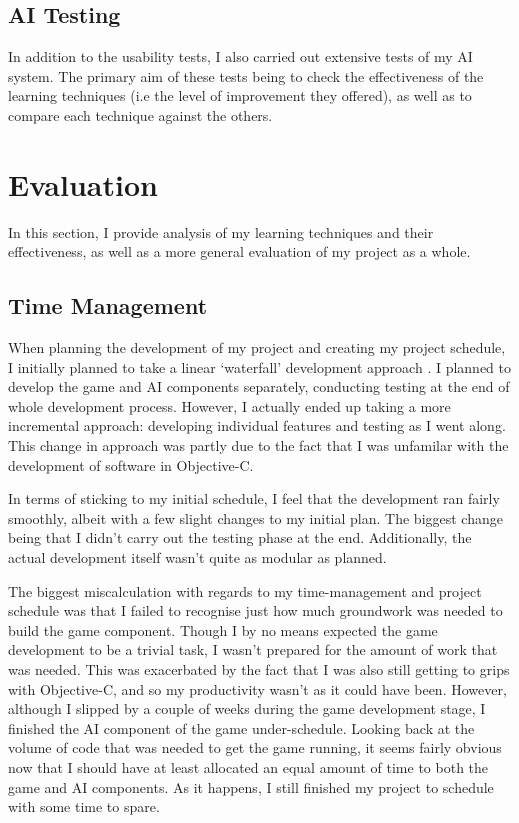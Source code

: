 \documentclass[a4paper,oneside]{report}
\begin{document}
\section{AI Testing}

In addition to the usability tests, I also carried out extensive tests of my AI system. The primary aim of these tests being to check the effectiveness of the learning techniques (i.e the level of improvement they offered), as well as to compare each technique against the others.



%
%

\chapter{Evaluation}

In this section, I provide analysis of my learning techniques and their effectiveness, as well as a more general evaluation of my project as a whole.

\section{Time Management}

When planning the development of my project and creating my project schedule, I initially planned to take a linear `waterfall' development approach \cite{Rerych:gb}. I planned to develop the game and AI components separately, conducting testing at the end of whole development process. However, I actually ended up taking a more incremental approach: developing individual features and testing as I went along. This change in approach was partly due to the fact that I was unfamilar with the development of software in Objective-C.

In terms of sticking to my initial schedule, I feel that the development ran fairly smoothly, albeit with a few slight changes to my initial plan. The biggest change being that I didn't carry out the testing phase at the end. Additionally, the actual development itself wasn't quite as modular as planned.

The biggest miscalculation with regards to my time-management and project schedule was that I failed to recognise just how much groundwork was needed to build the game component. Though I by no means expected the game development to be a trivial task, I wasn't prepared for the amount of work that was needed. This was exacerbated by the fact that I was also still getting to grips with Objective-C, and so my productivity wasn't as it could have been. However, although I slipped by a couple of weeks during the game development stage, I finished the AI component of the game under-schedule. Looking back at the volume of code that was needed to get the game running, it seems fairly obvious now that I should have at least allocated an equal amount of time to both the game and AI components. As it happens, I still finished my project to schedule with some time to spare.
\end{document}
